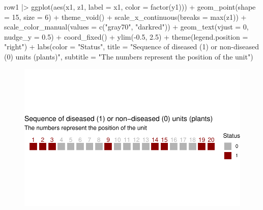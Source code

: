 \documentclass[
  letterpaper,
  DIV=11,
  numbers=noendperiod]{scrreprt}
\newenvironment{Shaded}{\begin{snugshade}}{\end{snugshade}}
\newcommand{\AttributeTok}[1]{\textcolor[rgb]{0.40,0.45,0.13}{#1}}
\newcommand{\DecValTok}[1]{\textcolor[rgb]{0.68,0.00,0.00}{#1}}
\newcommand{\FloatTok}[1]{\textcolor[rgb]{0.68,0.00,0.00}{#1}}
\newcommand{\FunctionTok}[1]{\textcolor[rgb]{0.28,0.35,0.67}{#1}}
\newcommand{\NormalTok}[1]{\textcolor[rgb]{0.00,0.23,0.31}{#1}}
\newcommand{\SpecialCharTok}[1]{\textcolor[rgb]{0.37,0.37,0.37}{#1}}
\newcommand{\StringTok}[1]{\textcolor[rgb]{0.13,0.47,0.30}{#1}}
\begin{document}
\begin{Shaded}
\begin{Highlighting}[]
\NormalTok{row1 }\SpecialCharTok{|\textgreater{}}
  \FunctionTok{ggplot}\NormalTok{(}\FunctionTok{aes}\NormalTok{(x1, z1, }\AttributeTok{label =}\NormalTok{ x1, }\AttributeTok{color =} \FunctionTok{factor}\NormalTok{(y1))) }\SpecialCharTok{+}
  \FunctionTok{geom\_point}\NormalTok{(}\AttributeTok{shape =} \DecValTok{15}\NormalTok{, }\AttributeTok{size =} \DecValTok{6}\NormalTok{) }\SpecialCharTok{+}
  \FunctionTok{theme\_void}\NormalTok{() }\SpecialCharTok{+}
  \FunctionTok{scale\_x\_continuous}\NormalTok{(}\AttributeTok{breaks =} \FunctionTok{max}\NormalTok{(z1)) }\SpecialCharTok{+}
  \FunctionTok{scale\_color\_manual}\NormalTok{(}\AttributeTok{values =} \FunctionTok{c}\NormalTok{(}\StringTok{"gray70"}\NormalTok{, }\StringTok{"darkred"}\NormalTok{)) }\SpecialCharTok{+}
  \FunctionTok{geom\_text}\NormalTok{(}\AttributeTok{vjust =} \DecValTok{0}\NormalTok{, }\AttributeTok{nudge\_y =} \FloatTok{0.5}\NormalTok{) }\SpecialCharTok{+}
  \FunctionTok{coord\_fixed}\NormalTok{() }\SpecialCharTok{+}
  \FunctionTok{ylim}\NormalTok{(}\SpecialCharTok{{-}}\FloatTok{0.5}\NormalTok{, }\FloatTok{2.5}\NormalTok{) }\SpecialCharTok{+}
  \FunctionTok{theme}\NormalTok{(}\AttributeTok{legend.position =} \StringTok{"right"}\NormalTok{) }\SpecialCharTok{+}
  \FunctionTok{labs}\NormalTok{(}\AttributeTok{color =} \StringTok{"Status"}\NormalTok{,}
       \AttributeTok{title =} \StringTok{"Sequence of diseased (1) or non{-}diseased (0) units (plants)"}\NormalTok{,}
       \AttributeTok{subtitle =} \StringTok{"The numbers represent the position of the unit"}\NormalTok{)}
\end{Highlighting}
\end{Shaded}

\begin{figure}[H]

{\centering \includegraphics{./spatial-tests_files/figure-pdf/unnamed-chunk-6-1.pdf}

}

\end{figure}
\end{document}
